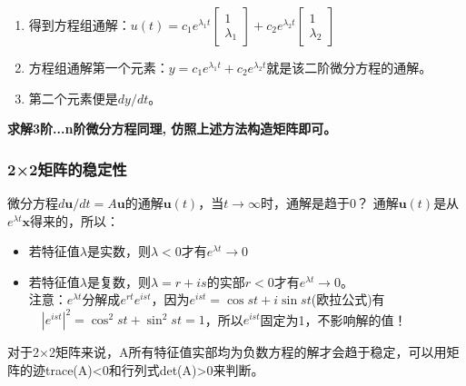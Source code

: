 \begin{enumerate}
        \item 得到方程组通解：$u(t)=c_{1} e^{\lambda_{1} t}\left[\begin{array}{c}{1} \\ {\lambda_{1}}\end{array}\right]+c_{2} e^{\lambda_{2} t}\left[\begin{array}{c}{1} \\ {\lambda_{2}}\end{array}\right]$
        \item 方程组通解第一个元素：$y=c_{1} e^{\lambda_{1} t}+c_{2} e^{\lambda_{2} t}$就是该二阶微分方程的通解。
        \item 第二个元素便是$d y / d t$。
    \end{enumerate}
    \textbf{求解3阶...n阶微分方程同理, 仿照上述方法构造矩阵即可。}

    \subsubsection{2×2矩阵的稳定性}
    微分方程$d \boldsymbol{u} / d t=A \boldsymbol{u}$的通解$\bm{u}(t)$，当$t \rightarrow \infty$时，通解是趋于0？
    通解$\bm{u}(t)$是从$e^{\lambda t} \boldsymbol{x}$得来的，所以：
    \begin{itemize}
        \item 若特征值$\lambda$是实数，则$\lambda < 0$才有$e^{\lambda t} \rightarrow 0$
        \item 若特征值$\lambda$是复数，则$\lambda=r+i s$的实部$r <0$才有$e^{\lambda t} \rightarrow 0$。\\注意：$e^{\lambda t}$分解成$e^{r t} e^{i s t}$，因为$e^{i s t}=\cos s t+i \sin s t$(欧拉公式)有$\quad\left|e^{i s t}\right|^{2}=\cos ^{2} s t+\sin ^{2} s t=1$，所以$e^{i s t}$固定为1，不影响解的值！
    \end{itemize}
    对于2×2矩阵来说，A所有特征值实部均为负数方程的解才会趋于稳定，可以用矩阵的迹trace(A)<0和行列式det(A)>0来判断。

